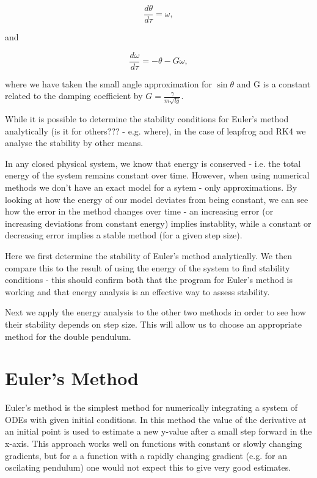 \documentclass[a4paper,11pt,twoside]{article}
\begin{document}
\begin{equation}
	\label{dtheta}
	\frac{d \theta}{d \tau} = \omega,
\end{equation}

and

\begin{equation}
	\label{domega}
	\frac{d \omega}{d \tau} = -\theta - G\omega,
\end{equation}

where we have taken the small angle approximation for \(\sin\theta\) 
and G is a constant related to the damping coefficient by
\(G = \frac{\gamma}{m\sqrt{lg}}\).

While it is possible to determine the stability conditions for Euler's
method analytically (is it for others??? - e.g. where), in the case of leapfrog and RK4 
we analyse the stability by other means.

In any closed physical system, we know that energy is 
conserved - i.e. the total energy of the system remains 
constant over time. However, when using numerical methods we don't have 
an exact model for a sytem - only approximations. By looking at 
how the energy of our model deviates from being constant, we can see 
how the error in the method changes over time - an increasing error 
(or increasing deviations from constant energy) implies instablity, while a constant 
or decreasing error implies a stable method (for a given step size).

Here we first determine the stability of Euler's method analytically. 
We then compare this to the result of using the energy of the system 
to find stability conditions - this should confirm both that the program 
for Euler's method is working and that energy analysis is an effective 
way to assess stability.

Next we apply the energy analysis to the other two methods in order to 
see how their stability depends on step size. This will allow us to choose 
an appropriate method for the double pendulum.

\section{Euler's Method}
Euler's method is the simplest method for numerically integrating a 
system of ODEs with given initial conditions. In this method the value 
of the derivative at an initial point is used to estimate a new y-value 
after a small step forward in the x-axis. This approach works well on
functions with constant or slowly changing gradients, but for a 
a function with a rapidly changing gradient (e.g. for an oscilating 
pendulum) one would not expect this to give very good estimates.
\end{document}
